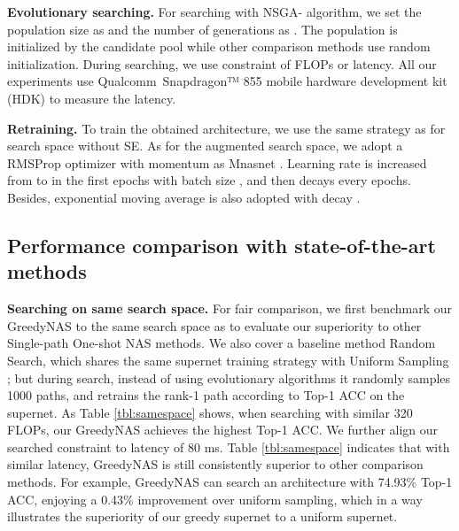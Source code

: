 \documentclass[10pt,twocolumn,letterpaper]{article}
\begin{document}
\textbf{Evolutionary searching.} For searching with NSGA- \cite{deb2002fast} algorithm, we set the population size as  and the number of generations as . The population is initialized by the candidate pool  while other comparison methods use random initialization. During searching, we use constraint of FLOPs or latency. All our experiments use Qualcomm\textregistered\  Snapdragon™ 855 mobile hardware development kit (HDK) to measure the latency. 

\textbf{Retraining.} To train the obtained architecture, we use the same strategy as \cite{proxylessnas} for search space without SE. As for the augmented search space, we adopt a RMSProp optimizer with  momentum as Mnasnet \cite{mnasnet}. Learning rate is increased from  to  in the first  epochs with batch size , and then decays  every  epochs. Besides, exponential moving average is also adopted with decay .




















\subsection{Performance comparison with state-of-the-art methods}
\textbf{Searching on same search space.} For fair comparison, we first benchmark our GreedyNAS to the same search space as \cite{proxylessnas} to evaluate our superiority to other Single-path One-shot NAS methods. We also cover a baseline method Random Search, which shares the same supernet training strategy with Uniform Sampling \cite{face++}; but during search, instead of using evolutionary algorithms it randomly samples 1000 paths, and retrains the rank-1 path according to Top-1 ACC on the supernet. As Table \ref{tbl:samespace} shows, when searching with similar 320 FLOPs, our GreedyNAS achieves the highest Top-1 ACC. We further align our searched constraint to latency of 80 ms. Table \ref{tbl:samespace} indicates that with similar latency, GreedyNAS is still consistently superior to other comparison methods. For example, GreedyNAS can search an architecture with 74.93\% Top-1 ACC, enjoying a 0.43\% improvement over uniform sampling, which in a way illustrates the superiority of our greedy supernet to a uniform supernet. 
\end{document}
